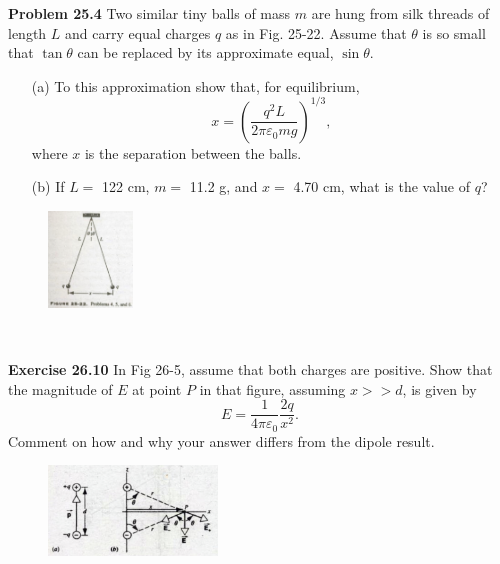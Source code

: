 \documentclass[letter,11pt]{article}
\begin{document}
\thispagestyle{fancy}
\renewcommand{\headrulewidth}{0pt}
\setlength{\headheight}{70pt}

\textbf{Problem 25.4} Two similar tiny balls of mass $m$ are hung from silk threads of length $L$ and carry equal charges $q$ as in Fig. 25-22. Assume that $\theta$ is so small that $\tan \theta$ can be replaced by its approximate equal, $\sin \theta$. 
\begin{enumerate}
	\item[(a)] To this approximation show that, for equilibrium,
		$$x = \left(\frac{q^2L}{2\pi\varepsilon_{0}mg}\right)^{1/3},$$
		where $x$ is the separation between the balls.
	\item[(b)] If $L =$ 122 cm, $m =$ 11.2 g, and $x =$ 4.70 cm, what is the value of $q$?
\end{enumerate}

\begin{figure}[h!]
	\centering
	\includegraphics[width=0.2\textwidth]{fig25-22.jpeg}
\end{figure}

\newpage
~\newpage

\setlength{\headheight}{10pt}

\textbf{Exercise 26.10} In Fig 26-5, assume that both charges are positive. Show that the magnitude of $E$ at point $P$ in that figure, assuming $x >> d$, is given by
$$E = \frac{1}{4\pi\varepsilon_{0}} \frac{2q}{x^2}.$$
Comment on how and why your answer differs from the dipole result.
\begin{figure}[h!]
	\centering
	\includegraphics[width=0.4\textwidth]{fig26-5.jpeg}
\end{figure}
\end{document}
